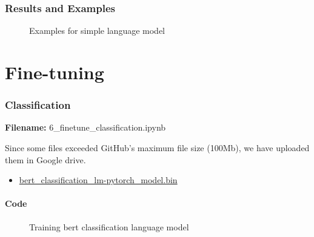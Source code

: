 \documentclass[12pt, a4paper]{article}
\begin{document}
\section*{Results and Examples}
\begin{figure}[H]
	\caption{Examples for simple language model}
	\label{normal-lm_examples}
\end{figure}


\newpage
\part{Fine-tuning}

\section*{Classification}
\large{\textbf{Filename:} 6\_finetune\_classification.ipynb}

Since some files exceeded GitHub's maximum file size (100Mb), we have uploaded them in Google drive.
\begin{itemize}
	\item \href{https://drive.google.com/file/d/1Lbbhh2N92k3IjuZ5TObauPd2en5qAT6i/view?usp=sharing}{bert\_classification\_lm-pytorch\_model.bin}
\end{itemize}

\subsection*{Code}

\begin{figure}[H]
	\caption{Training bert classification language model}
	\label{classification-lm_train}
\end{figure}
\end{document}
